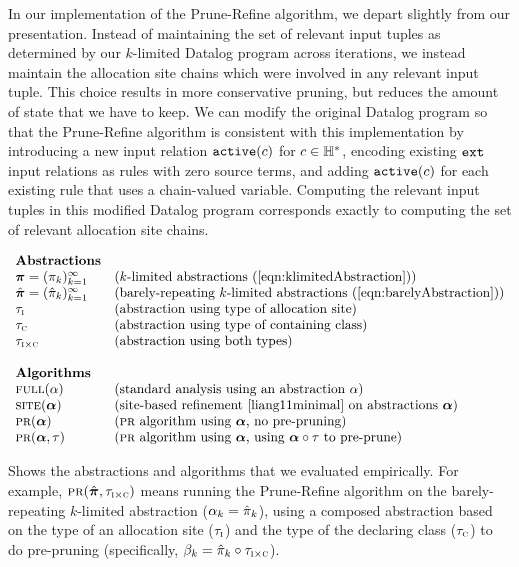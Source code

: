 In our implementation of the Prune-Refine algorithm, we depart slightly from our
presentation.  Instead of maintaining the set of relevant input tuples as
determined by our $k$-limited Datalog program across iterations, we instead
maintain the allocation site chains which were involved in any relevant input
tuple.  This choice results in more conservative pruning, but reduces the
amount of state that we have to keep.
We can modify the original Datalog program so that the Prune-Refine algorithm
is consistent with this implementation by introducing a new input relation
$\text{\tt active}(c)$ for $c \in {\mathbb H}^*$, encoding existing $\text{\tt ext}$ input relations as rules
with zero source terms, and adding $\text{\tt active}(c)$ for each existing
rule that uses a chain-valued variable.  Computing the
relevant input tuples in this modified Datalog program corresponds exactly to
computing the set of relevant allocation site chains.

\begin{table}
\[
\begin{array}{ll}
\text{\bf Abstractions} \\
\Klimabs = (\klimabs_k)_{k=1}^\infty   & \defn{$k$-limited abstractions \refeqn{klimitedAbstraction}} \\
\Klimdabs = (\klimdabs_k)_{k=1}^\infty & \defn{barely-repeating $k$-limited abstractions \refeqn{barelyAbstraction}} \\
\hclassIs                              & \defn{abstraction using type of allocation site} \\
\hclassHas                             & \defn{abstraction using type of containing class} \\
\hclassIsHas                           & \defn{abstraction using both types} \\
\\
\text{\bf Algorithms} \\
\Full(\alpha)         & \defn{standard analysis using an abstraction $\alpha$} \\
\Site(\balpha)        & \defn{site-based refinement \cite{liang11minimal} on abstractions $\balpha$} \\
\PR(\balpha)          & \defn{\PR\ algorithm using $\balpha$, no pre-pruning} \\
\PR(\balpha,\hclass)  & \defn{\PR\ algorithm using $\balpha$, using $\balpha\circ\hclass$ to pre-prune} \\
\end{array}
\]
\caption{\label{tab:algorithms} Shows the abstractions and algorithms that we evaluated empirically.
For example,
$\text{\sc pr}(\hat{\mbox{\boldmath$\pi$}},\tau_{\text{\sc i} \times \text{\sc c}})$
means running the Prune-Refine algorithm on the barely-repeating $k$-limited abstraction ($\alpha_k = \hat{\pi}_k$),
using a composed abstraction based on the type of an allocation site ($\tau_{\text{\sc i}}$) 
and the type of the declaring class ($\tau_{\text{\sc c}}$) to do pre-pruning
(specifically, $\beta_k = \hat{\pi}_k \circ \tau_{\text{\sc i} \times \text{\sc c}}$).
}
\end{table}

